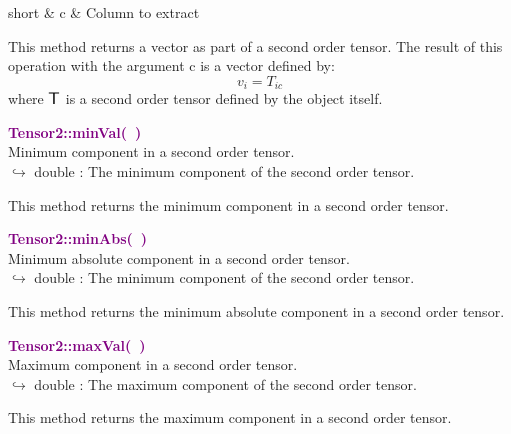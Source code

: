 \begin{tcolorbox}[width=\textwidth,myArgs,tabularx={ll|R}]
short & c & Column to extract
\end{tcolorbox}

This method returns a vector as part of a second order tensor.
The result of this operation with the argument c is a vector defined by:
\begin{equation*}
v_{i} = T_{ic}
\end{equation*}
where $\mbox{\large\ensuremath{\mathsf{T}}}$ is a second order tensor defined by the object itself.

\textcolor{purple}{\textbf{Tensor2::minVal(~)}}\label{Tensor2::minVal()}\\
Minimum component in a second order tensor.\\ \hspace*{10mm}$\hookrightarrow$ double : The minimum component of the second order tensor.

This method returns the minimum component in a second order tensor.

\textcolor{purple}{\textbf{Tensor2::minAbs(~)}}\label{Tensor2::minAbs()}\\
Minimum absolute component in a second order tensor.\\ \hspace*{10mm}$\hookrightarrow$ double : The minimum component of the second order tensor.

This method returns the minimum absolute component in a second order tensor.

\textcolor{purple}{\textbf{Tensor2::maxVal(~)}}\label{Tensor2::maxVal()}\\
Maximum component in a second order tensor.\\ \hspace*{10mm}$\hookrightarrow$ double : The maximum component of the second order tensor.

This method returns the maximum component in a second order tensor.

